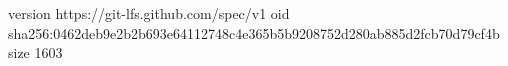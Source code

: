 version https://git-lfs.github.com/spec/v1
oid sha256:0462deb9e2b2b693e64112748c4e365b5b9208752d280ab885d2fcb70d79cf4b
size 1603
